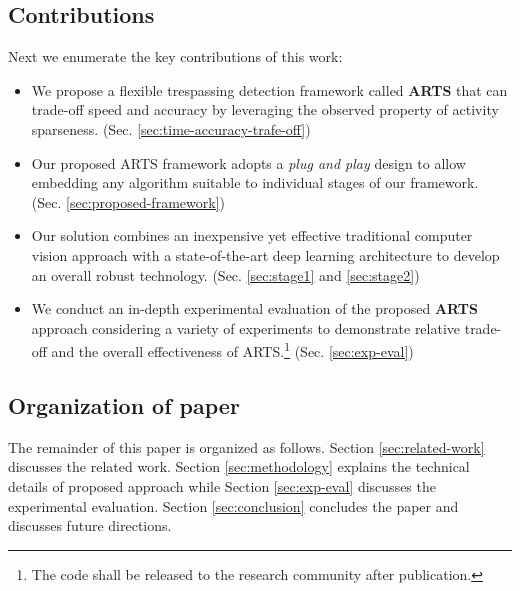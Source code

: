 \subsection{Contributions}
Next we enumerate the key contributions of this work:
\begin{itemize}
\item We propose a flexible trespassing detection framework called \textbf{ARTS} that can trade-off speed and accuracy by leveraging the observed property of activity sparseness. (Sec. \ref{sec:time-accuracy-trafe-off})

\item Our proposed ARTS framework adopts a \textit{plug and play} design to allow embedding any algorithm suitable to individual stages of our framework. (Sec. \ref{sec:proposed-framework})

\item Our solution combines an inexpensive yet effective traditional computer vision approach with a state-of-the-art deep learning architecture to develop an overall robust technology. (Sec. \ref{sec:stage1} and \ref{sec:stage2})

\item We conduct an in-depth experimental evaluation of the proposed \textbf{ARTS} approach considering a variety of experiments to demonstrate relative trade-off and the overall effectiveness of ARTS.\footnote{The code shall be released to the research community after publication.} (Sec. \ref{sec:exp-eval})



\end{itemize}
\subsection{Organization of paper}
The remainder of this paper is organized as follows.  Section \ref{sec:related-work} discusses the related work. Section \ref{sec:methodology} explains the technical details of proposed approach while Section \ref{sec:exp-eval} discusses the experimental evaluation. Section \ref{sec:conclusion} concludes the paper and discusses future directions. 